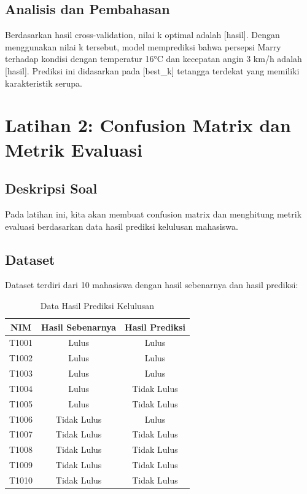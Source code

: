 \documentclass[12pt,a4paper]{article}
\begin{document}
\subsection{Analisis dan Pembahasan}
Berdasarkan hasil cross-validation, nilai k optimal adalah [hasil]. Dengan menggunakan nilai k tersebut, model memprediksi bahwa persepsi Marry terhadap kondisi dengan temperatur 16°C dan kecepatan angin 3 km/h adalah [hasil]. Prediksi ini didasarkan pada [best\_k] tetangga terdekat yang memiliki karakteristik serupa.

\section{Latihan 2: Confusion Matrix dan Metrik Evaluasi}

\subsection{Deskripsi Soal}
Pada latihan ini, kita akan membuat confusion matrix dan menghitung metrik evaluasi berdasarkan data hasil prediksi kelulusan mahasiswa.

\subsection{Dataset}
Dataset terdiri dari 10 mahasiswa dengan hasil sebenarnya dan hasil prediksi:

\begin{table}[H]
\centering
\caption{Data Hasil Prediksi Kelulusan}
\begin{tabular}{|c|c|c|}
\hline
\textbf{NIM} & \textbf{Hasil Sebenarnya} & \textbf{Hasil Prediksi} \\
\hline
T1001 & Lulus & Lulus \\
T1002 & Lulus & Lulus \\
T1003 & Lulus & Lulus \\
T1004 & Lulus & Tidak Lulus \\
T1005 & Lulus & Tidak Lulus \\
T1006 & Tidak Lulus & Lulus \\
T1007 & Tidak Lulus & Tidak Lulus \\
T1008 & Tidak Lulus & Tidak Lulus \\
T1009 & Tidak Lulus & Tidak Lulus \\
T1010 & Tidak Lulus & Tidak Lulus \\
\hline
\end{tabular}
\end{table}
\end{document}
